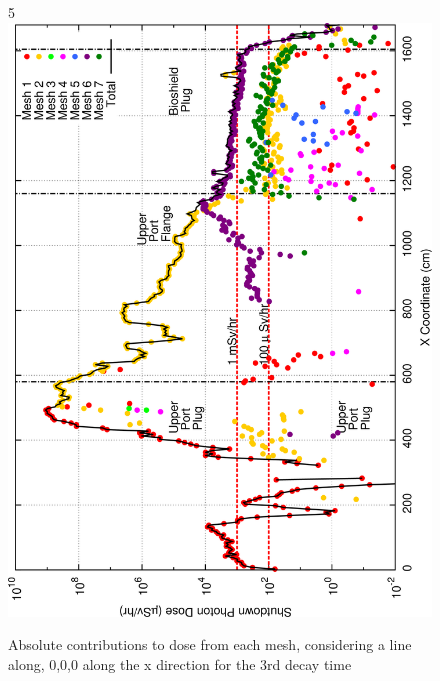 \documentclass[12pt]{article}
\begin{document}
\begin{figure}[ht!]
5\centering
\includegraphics[clip,scale=0.25]{../plots/crosstalk/nob4c/up/dc3.png}
\caption{Absolute contributions to dose from each mesh, considering a line along, 0,0,0 along the x direction for the 3rd decay time}
\label{fig:ct_up_dc3}
\end{figure}
\end{document}
